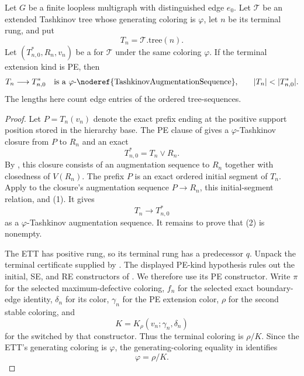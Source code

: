 \begin{lemma}
Let $G$ be a finite loopless multigraph with distinguished edge $e_0$.
Let $\mathcal T$ be an extended Tashkinov tree whose generating coloring is
$\varphi$, let $n$ be its terminal rung, and put
\[
                         T_n=\mathcal T.\mathrm{tree}(n).
\]
Let $(T_{n,0}^{*},R_n,v_n)$ be a
 for $\mathcal T$ under the same coloring
$\varphi$.  If the terminal extension kind is PE, then
\[
 T_n\longrightarrow T_{n,0}^{*}
 \quad\text{is a $\varphi$-\noderef{TashkinovAugmentationSequence},}
 \qquad |T_n|<|T_{n,0}^{*}|.
\]
The lengths here count edge entries of the ordered tree-sequences.
\end{lemma}
\begin{proof}
Let $P=T_n(v_n)$ denote the exact prefix ending at the positive support
position stored in the hierarchy base.  The PE clause of
 gives a $\varphi$-Tashkinov closure from $P$ to
$R_n$ and an exact 
\[
                         T_{n,0}^{*}=T_n\vee R_n.                \tag{1}
\]
By , this closure consists of an augmentation
sequence to $R_n$ together with closedness of $V(R_n)$.
The prefix $P$ is an exact ordered initial segment of $T_n$.  Apply
 to the closure's
augmentation sequence $P\longrightarrow R_n$, this initial-segment
relation, and (1).  It gives
\[
                         T_n\longrightarrow T_{n,0}^{*}          \tag{2}
\]
as a $\varphi$-Tashkinov augmentation sequence.  It remains to prove
that (2) is nonempty.

The ETT has positive rung, so its terminal rung has a predecessor $q$.
Unpack the terminal certificate supplied by .
The displayed PE-kind hypothesis rules out the initial, SE, and RE
constructors of .  We therefore use its PE
constructor.  Write
\(
 \pi
\)
for the selected maximum-defective coloring, $f_n$ for the selected exact
boundary-edge identity, $\delta_n$ for its color, $\gamma_n$ for the PE
extension color, $\rho$ for the second stable coloring, and
\[
 K=K_{\rho}(v_n;\gamma_n,\delta_n)
\]
for the  switched by that constructor.  Thus the
terminal coloring is $\rho/K$.  Since the ETT's generating coloring is
$\varphi$, the generating-coloring equality in
 identifies
\[
                            \varphi=\rho/K.                       \tag{3}
\]


\end{proof}
